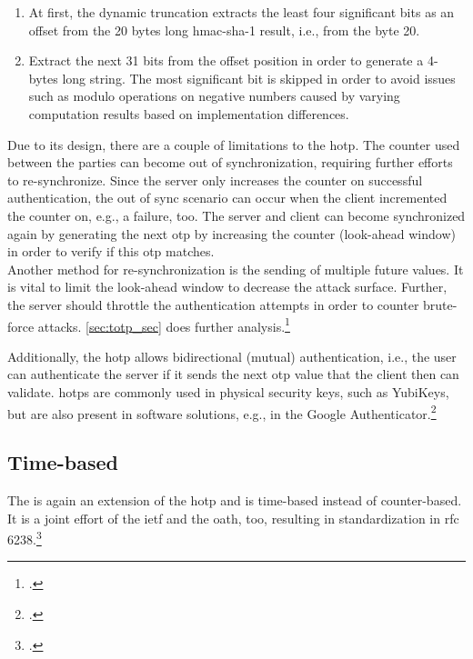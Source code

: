 \begin{enumerate}
	\item At first, the dynamic truncation extracts the least four significant bits as an offset from the 20 bytes long \gls{hmac}-\gls{sha}-1 result, i.e., from the byte 20.
	\item Extract the next 31 bits from the offset position in order to generate a 4-bytes long string. The most significant bit is skipped in order to avoid issues such as modulo operations on negative numbers caused by varying computation results based on implementation differences.
\end{enumerate}

Due to its design, there are a couple of limitations to the \gls{hotp}. The counter used between the parties can become out of synchronization, requiring further efforts to re-synchronize. Since the server only increases the counter on successful authentication, the out of sync scenario can occur when the client incremented the counter on, e.g., a failure, too. The server and client can become synchronized again by generating the next \gls{otp} by increasing the counter (look-ahead window) in order to verify if this \gls{otp} matches.\\
Another method for re-synchronization is the sending of multiple future values. It is vital to limit the look-ahead window to decrease the attack surface. Further, the server should throttle the authentication attempts in order to counter brute-force attacks. \autoref{sec:totp_sec} does further analysis.\footcites[See][236]{Schwartz2018}[See][Chapter 13.5.1]{2308830}

Additionally, the \gls{hotp} allows bidirectional (mutual) authentication, i.e., the user can authenticate the server if it sends the next \gls{otp} value that the client then can validate. \Glspl{hotp} are commonly used in physical security keys, such as YubiKeys, but are also present in software solutions, e.g., in the Google Authenticator.\footcites[See][716]{HUSEYNOV2017715}[See][14]{m2005rfc}

\subsection{Time-based}
\label{subsec:totp}

The  is again an extension of the \gls{hotp} and is time-based instead of counter-based. It is a joint effort of the \gls{ietf} and the \gls{oath}, too, resulting in standardization in \gls{rfc} 6238.\footcite[See][]{m2011rfc}

